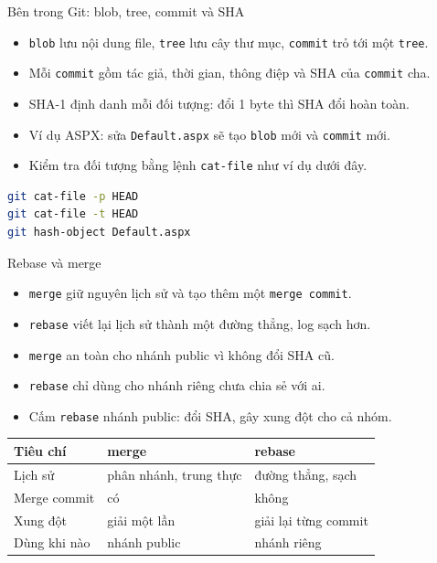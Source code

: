 \begin{frame}[fragile]{Bên trong Git: blob, tree, commit và SHA}
\begin{itemize}
\item \texttt{blob} lưu nội dung file, \texttt{tree} lưu cây thư mục, \texttt{commit} trỏ tới một \texttt{tree}.
\item Mỗi \texttt{commit} gồm tác giả, thời gian, thông điệp và SHA của \texttt{commit} cha.
\item SHA-1 định danh mỗi đối tượng: đổi 1 byte thì SHA đổi hoàn toàn.
\item Ví dụ ASPX: sửa \texttt{Default.aspx} sẽ tạo \texttt{blob} mới và \texttt{commit} mới.
\item Kiểm tra đối tượng bằng lệnh \texttt{cat-file} như ví dụ dưới đây.
\end{itemize}
\begin{lstlisting}[language=bash]
git cat-file -p HEAD
git cat-file -t HEAD
git hash-object Default.aspx
\end{lstlisting}
\end{frame}

\begin{frame}{Rebase và merge}
\begin{itemize}
\item \texttt{merge} giữ nguyên lịch sử và tạo thêm một \texttt{merge commit}.
\item \texttt{rebase} viết lại lịch sử thành một đường thẳng, log sạch hơn.
\item \texttt{merge} an toàn cho nhánh public vì không đổi SHA cũ.
\item \texttt{rebase} chỉ dùng cho nhánh riêng chưa chia sẻ với ai.
\item Cấm \texttt{rebase} nhánh public: đổi SHA, gây xung đột cho cả nhóm.
\end{itemize}
\begin{tabular}{lll}
\toprule
Tiêu chí & merge & rebase \\
\midrule
Lịch sử & phân nhánh, trung thực & đường thẳng, sạch \\
Merge commit & có & không \\
Xung đột & giải một lần & giải lại từng commit \\
Dùng khi nào & nhánh public & nhánh riêng \\
\bottomrule
\end{tabular}
\end{frame}

